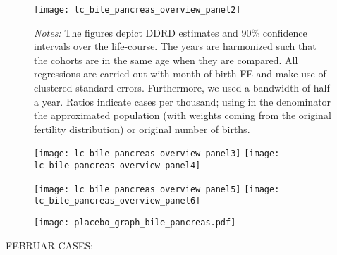 \begin{landscape}
\begin{figure}[H]
\centering
\begin{minipage}{.9\linewidth}
\texttt{[image: lc\_bile\_pancreas\_overview\_panel2]}
{\scriptsize \emph{Notes:} The figures depict DDRD estimates and 90\% confidence intervals over the life-course. The years are harmonized such that the cohorts are in the same age when they are compared. All regressions are carried out with month-of-birth FE and make use of clustered standard errors. Furthermore, we used a bandwidth of half a year. Ratios indicate cases per thousand; using in the denominator the approximated population (with weights coming from the original fertility distribution) or original number of births. \par}
\end{minipage}
\end{figure}
\end{landscape}
\begin{figure}[H]%
	\centering
	\texttt{[image: lc\_bile\_pancreas\_overview\_panel3]}
	\texttt{[image: lc\_bile\_pancreas\_overview\_panel4]}
\end{figure}
\begin{figure}[H]
	\centering	
	\texttt{[image: lc\_bile\_pancreas\_overview\_panel5]}
	\texttt{[image: lc\_bile\_pancreas\_overview\_panel6]}
\end{figure}
%
\begin{figure}[H]%
	\centering
	\texttt{[image: placebo\_graph\_bile\_pancreas.pdf]}
\end{figure}




%
FEBRUAR CASES:


